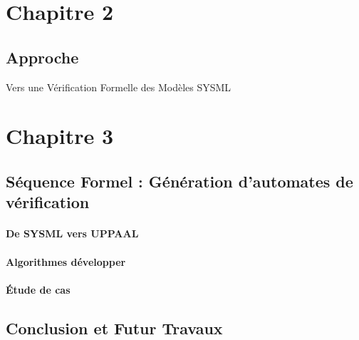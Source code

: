\documentclass[french]{spimufcphdthesis}
\begin{document}
\part{Chapitre 2}
\chapter{Approche}
Vers une Vérification Formelle des Modèles SYSML

\part{Chapitre 3}
\chapter{Séquence Formel : Génération d'automates de vérification}
\subsection{De SYSML vers UPPAAL}
\subsection{Algorithmes développer}
\subsection{Étude de cas}

\chapter{Conclusion et Futur Travaux}
\end{document}

